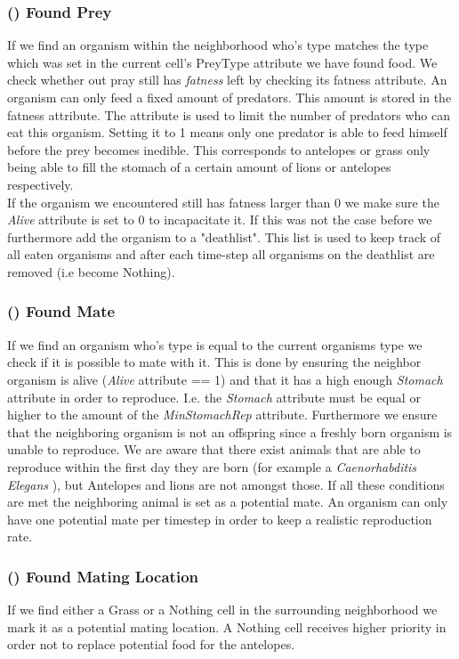 \documentclass[11pt]{article}
\begin{document}
\subsubsection{() Found Prey}
If we find an organism within the neighborhood who's type matches the type which was set in the current cell's PreyType attribute we have found food. We check whether out pray still has {\it fatness} left by checking its fatness attribute. An organism can only feed a fixed amount of predators. This amount is stored in the fatness attribute. The attribute is used to limit the number of predators who can eat this organism. Setting it to 1 means only one predator is able to feed himself before the prey becomes inedible. This corresponds to antelopes or grass only being able to fill the stomach of a certain amount of lions or antelopes respectively.\\
If the organism we encountered still has fatness larger than 0 we make sure the {\it Alive} attribute is set to 0 to incapacitate it. If this was not the case before we furthermore add the organism to a "deathlist". This list is used to keep track of all eaten organisms and after each time-step all organisms on the deathlist are removed (i.e become Nothing). 

\addtocounter{protocolCounter}{1}
\subsubsection{() Found Mate}
If we find an organism who's type is equal to the current organisms type we check if it is possible to mate with it. This is done by ensuring the neighbor organism is alive ({\it Alive} attribute == 1) and that it has a high enough {\it Stomach} attribute in order to reproduce. I.e. the {\it Stomach} attribute must be equal or higher to the amount of the {\it MinStomachRep} attribute. Furthermore we ensure that the neighboring organism is not an offspring since a freshly born organism is unable to reproduce. We are aware that there exist animals that are able to reproduce within the first day they are born (for example a {\it Caenorhabditis Elegans} \cite{caenorhabditisElegans}), but Antelopes and lions are not amongst those. If all these conditions are met the neighboring animal is set as a potential mate. An organism can only have one potential mate per timestep in order to keep a realistic reproduction rate.

\addtocounter{protocolCounter}{1}
\subsubsection{() Found Mating Location}
If we find either a Grass or a Nothing cell in the surrounding neighborhood we mark it as a potential mating location. A Nothing cell receives higher priority in order not to replace potential food for the antelopes. 
\end{document}
